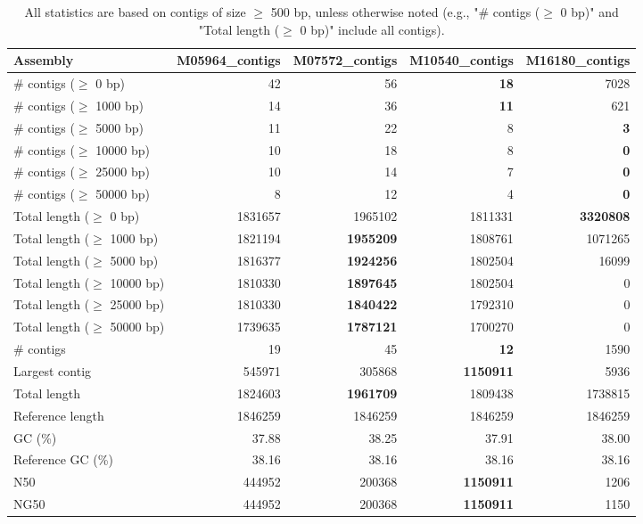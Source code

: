 \documentclass[12pt,a4paper]{article}
\begin{document}
\begin{table}[ht]
\begin{center}
\caption{All statistics are based on contigs of size $\geq$ 500 bp, unless otherwise noted (e.g., "\# contigs ($\geq$ 0 bp)" and "Total length ($\geq$ 0 bp)" include all contigs).}
\begin{tabular}{|l*{4}{|r}|}
\hline
Assembly & M05964\_contigs & M07572\_contigs & M10540\_contigs & M16180\_contigs \\ \hline
\# contigs ($\geq$ 0 bp) & 42 & 56 & {\bf 18} & 7028 \\ \hline
\# contigs ($\geq$ 1000 bp) & 14 & 36 & {\bf 11} & 621 \\ \hline
\# contigs ($\geq$ 5000 bp) & 11 & 22 & 8 & {\bf 3} \\ \hline
\# contigs ($\geq$ 10000 bp) & 10 & 18 & 8 & {\bf 0} \\ \hline
\# contigs ($\geq$ 25000 bp) & 10 & 14 & 7 & {\bf 0} \\ \hline
\# contigs ($\geq$ 50000 bp) & 8 & 12 & 4 & {\bf 0} \\ \hline
Total length ($\geq$ 0 bp) & 1831657 & 1965102 & 1811331 & {\bf 3320808} \\ \hline
Total length ($\geq$ 1000 bp) & 1821194 & {\bf 1955209} & 1808761 & 1071265 \\ \hline
Total length ($\geq$ 5000 bp) & 1816377 & {\bf 1924256} & 1802504 & 16099 \\ \hline
Total length ($\geq$ 10000 bp) & 1810330 & {\bf 1897645} & 1802504 & 0 \\ \hline
Total length ($\geq$ 25000 bp) & 1810330 & {\bf 1840422} & 1792310 & 0 \\ \hline
Total length ($\geq$ 50000 bp) & 1739635 & {\bf 1787121} & 1700270 & 0 \\ \hline
\# contigs & 19 & 45 & {\bf 12} & 1590 \\ \hline
Largest contig & 545971 & 305868 & {\bf 1150911} & 5936 \\ \hline
Total length & 1824603 & {\bf 1961709} & 1809438 & 1738815 \\ \hline
Reference length & 1846259 & 1846259 & 1846259 & 1846259 \\ \hline
GC (\%) & 37.88 & 38.25 & 37.91 & 38.00 \\ \hline
Reference GC (\%) & 38.16 & 38.16 & 38.16 & 38.16 \\ \hline
N50 & 444952 & 200368 & {\bf 1150911} & 1206 \\ \hline
NG50 & 444952 & 200368 & {\bf 1150911} & 1150 \\ \hline

\end{tabular}
\end{center}
\end{table}
\end{document}

